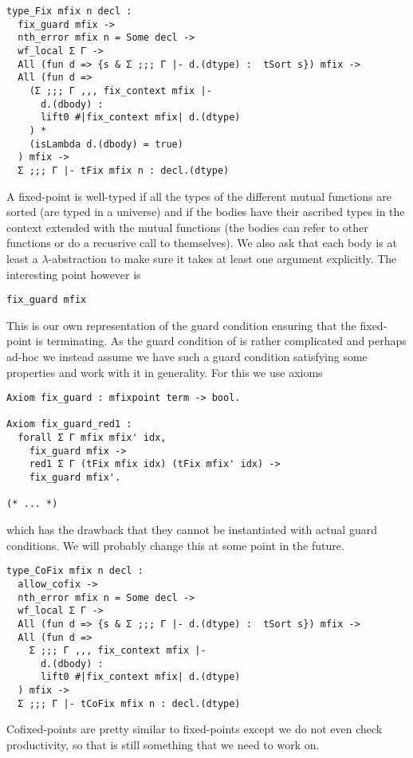 \begin{verbatim}
type_Fix mfix n decl :
  fix_guard mfix ->
  nth_error mfix n = Some decl ->
  wf_local Σ Γ ->
  All (fun d => {s & Σ ;;; Γ |- d.(dtype) :  tSort s}) mfix ->
  All (fun d =>
    (Σ ;;; Γ ,,, fix_context mfix |-
      d.(dbody) :
      lift0 #|fix_context mfix| d.(dtype)
    ) *
    (isLambda d.(dbody) = true)
  ) mfix ->
  Σ ;;; Γ |- tFix mfix n : decl.(dtype)
\end{verbatim}
A fixed-point is well-typed if all the types of the different mutual functions
are sorted (\ie are typed in a universe) and if the bodies have their ascribed
types in the context extended with the mutual functions (the bodies can refer
to other functions or do a recusrive call to themselves).
We also ask that each body is at least a \(\lambda\)-abstraction to make sure it
takes at least one argument explicitly.
The interesting point however is
\begin{verbatim}
fix_guard mfix
\end{verbatim}
This is our own representation of the guard condition ensuring that the
fixed-point is terminating. As the guard condition of \Coq is rather complicated
and perhaps ad-hoc we instead assume we have such a guard condition satisfying
some properties and work with it in generality.
For this we use axioms
\begin{verbatim}
Axiom fix_guard : mfixpoint term -> bool.

Axiom fix_guard_red1 :
  forall Σ Γ mfix mfix' idx,
    fix_guard mfix ->
    red1 Σ Γ (tFix mfix idx) (tFix mfix' idx) ->
    fix_guard mfix'.

(* ... *)
\end{verbatim}
which has the drawback that they cannot be instantiated with actual guard
conditions. We will probably change this at some point in the future.

\begin{verbatim}
type_CoFix mfix n decl :
  allow_cofix ->
  nth_error mfix n = Some decl ->
  wf_local Σ Γ ->
  All (fun d => {s & Σ ;;; Γ |- d.(dtype) :  tSort s}) mfix ->
  All (fun d =>
    Σ ;;; Γ ,,, fix_context mfix |-
      d.(dbody) :
      lift0 #|fix_context mfix| d.(dtype)
  ) mfix ->
  Σ ;;; Γ |- tCoFix mfix n : decl.(dtype)
\end{verbatim}
Cofixed-points are pretty similar to fixed-points except we do not even check
productivity, so that is still something that we need to work on.

